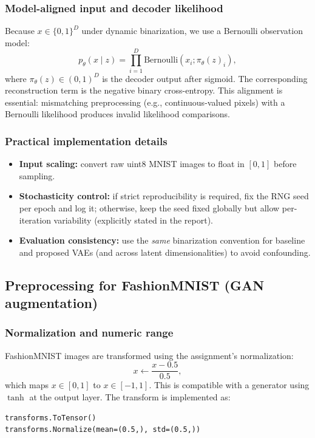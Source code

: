 \subsubsection{Model-aligned input and decoder likelihood}
Because $x\in\{0,1\}^{D}$ under dynamic binarization, we use a Bernoulli observation model:
\[
p_\theta(x\mid z)=\prod_{i=1}^{D}\mathrm{Bernoulli}\left(x_i;\pi_{\theta}(z)_i\right),
\]
where $\pi_\theta(z)\in(0,1)^D$ is the decoder output after sigmoid. The corresponding reconstruction term is the negative binary cross-entropy. This alignment is essential: mismatching preprocessing (e.g., continuous-valued pixels) with a Bernoulli likelihood produces invalid likelihood comparisons.

\subsubsection{Practical implementation details}
\begin{itemize}
  \item \textbf{Input scaling:} convert raw uint8 MNIST images to float in $[0,1]$ before sampling.
  \item \textbf{Stochasticity control:} if strict reproducibility is required, fix the RNG seed per epoch and log it; otherwise, keep the seed fixed globally but allow per-iteration variability (explicitly stated in the report).
  \item \textbf{Evaluation consistency:} use the \emph{same} binarization convention for baseline and proposed VAEs (and across latent dimensionalities) to avoid confounding.
\end{itemize}

\subsection{Preprocessing for FashionMNIST (GAN augmentation)}
\subsubsection{Normalization and numeric range}
FashionMNIST images are transformed using the assignment's normalization:
\[
x \leftarrow \frac{x-0.5}{0.5},
\]
which maps $x\in[0,1]$ to $x\in[-1,1]$. This is compatible with a generator using $\tanh$ at the output layer. The transform is implemented as:
\begin{verbatim}
transforms.ToTensor()
transforms.Normalize(mean=(0.5,), std=(0.5,))
\end{verbatim}

